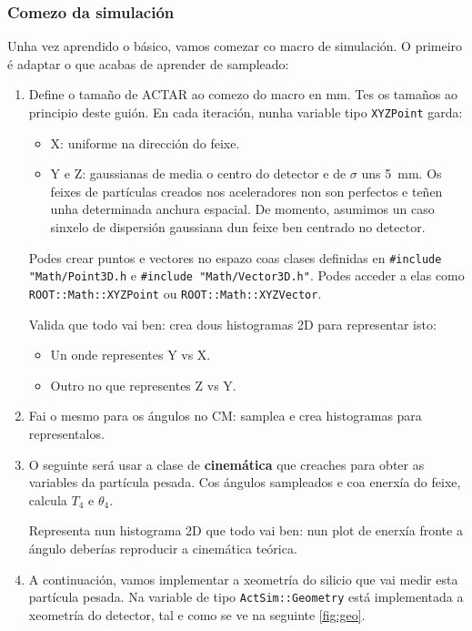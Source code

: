 \documentclass[11pt, a4paper]{article}
\begin{document}
\subsubsection*{Comezo da simulación}
Unha vez aprendido o básico, vamos comezar co macro de simulación. O primeiro é adaptar o que acabas de aprender de sampleado:
\begin{enumerate}
    \item Define o tamaño de ACTAR ao comezo do macro en \unit{\mm}. Tes os tamaños ao principio deste guión. En cada iteración, nunha variable tipo \lstinline|XYZPoint| garda:
          \begin{itemize}
              \item X: uniforme na dirección do feixe.
              \item Y e Z: gaussianas de media o centro do detector e de $\sigma$ uns \qty{5}{\mm}. Os feixes de partículas creados nos aceleradores non son perfectos e teñen unha determinada anchura espacial. De momento, asumimos un caso sinxelo de dispersión gaussiana dun feixe ben centrado no detector.
          \end{itemize}
          Podes crear puntos e vectores no espazo coas clases definidas en \lstinline|#include "Math/Point3D.h| e \lstinline|#include "Math/Vector3D.h"|. Podes acceder a elas como \lstinline|ROOT::Math::XYZPoint| ou \lstinline|ROOT::Math::XYZVector|.

          Valida que todo vai ben: crea dous histogramas 2D para representar isto:
          \begin{itemize}
              \item Un onde representes Y vs X.
              \item Outro no que representes Z vs Y.
          \end{itemize}
          \item  Fai o mesmo para os ángulos no CM: samplea e crea histogramas para representalos.

          \item   O seguinte será usar a clase de \textbf{cinemática} que creaches para obter as variables da partícula pesada. Cos ángulos sampleados e coa enerxía do feixe, calcula $T_4$ e $\theta_{4}$.
          
          Representa nun histograma 2D que todo vai ben: nun plot de enerxía fronte a ángulo deberías reproducir a cinemática teórica.

          \item  A continuación, vamos implementar a xeometría do silicio que vai medir esta partícula pesada. Na variable de tipo \lstinline|ActSim::Geometry| está implementada a xeometría do detector, tal e como se ve na seguinte \autoref{fig:geo}. 


\end{enumerate}
\end{document}
